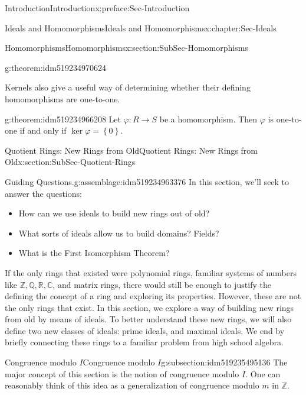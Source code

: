\documentclass[oneside,10pt,]{book}
\numberwithin{equation}{section}
\def\p{\varphi}
\newcommand{\set}[1]{\left\{ {#1} \right\}}
\def\C{{\mathbb C}}
\def\Z{{\mathbb Z}}
\def\Q{{\mathbb Q}}
\def\R{{\mathbb R}}
\begin{document}
\begin{preface}{Introduction}{}{Introduction}{}{}{x:preface:Sec-Introduction}
\begin{chapterptx}{Ideals and Homomorphisms}{}{Ideals and Homomorphisms}{}{}{x:chapter:Sec-Ideals}
\begin{sectionptx}{Homomorphisms}{}{Homomorphisms}{}{}{x:section:SubSec-Homomorphisms}
\begin{theorem}{}{}{g:theorem:idm519234970624}
\end{theorem}
Kernels also give a useful way of determining whether their defining homomorphisms are one-to-one.%
\begin{theorem}{}{}{g:theorem:idm519234966208}%
Let \(\p : R\to S\) be a homomorphism. Then \(\p\) is one-to-one if and only if \(\ker\p = \set{0}\).%
\end{theorem}
\end{sectionptx}
%
%
\typeout{************************************************}
\typeout{************************************************}
%
\begin{sectionptx}{Quotient Rings: New Rings from Old}{}{Quotient Rings: New Rings from Old}{}{}{x:section:SubSec-Quotient-Rings}
\begin{assemblage}{Guiding Questions.}{g:assemblage:idm519234963376}%
In this section, we'll seek to answer the questions: %
\begin{itemize}[label=\textbullet]
\item{}How can we use ideals to build new rings out of old?%
\item{}What sorts of ideals allow us to build domains? Fields?%
\item{}What is the First Isomorphism Theorem?%
\end{itemize}
%
\end{assemblage}
\begin{introduction}{}%
If the only rings that existed were polynomial rings, familiar systems of numbers like \(\Z, \Q, \R, \C\), and matrix rings, there would still be enough to justify the defining the concept of a ring and exploring its properties. However, these are not the only rings that exist. In this section, we explore a way of building new rings from old by means of ideals. To better understand these new rings, we will also define two new classes of ideals: prime ideals, and maximal ideals. We end by briefly connecting these rings to a familiar problem from high school algebra.%
\end{introduction}%
%
%
\typeout{************************************************}
\typeout{************************************************}
%
\begin{subsectionptx}{Congruence modulo \(I\)}{}{Congruence modulo \(I\)}{}{}{g:subsection:idm519235495136}
The major concept of this section is the notion of congruence modulo \(I\). One can reasonably think of this idea as a generalization of congruence modulo \(m\) in \(\Z\).%

\end{subsectionptx}
\end{sectionptx}
\end{chapterptx}
\end{preface}
\end{document}
